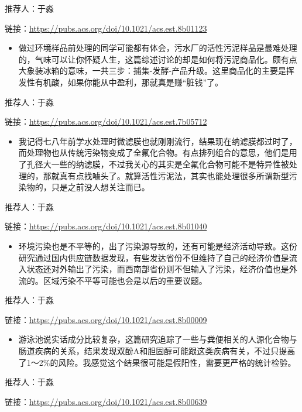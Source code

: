 \documentclass[
]{book}
\providecommand{\tightlist}{%
  \setlength{\itemsep}{0pt}\setlength{\parskip}{0pt}}
\begin{document}
推荐人：于淼

链接：\url{https://pubs.acs.org/doi/10.1021/acs.est.8b01123}

\begin{itemize}
\tightlist
\item
  做过环境样品前处理的同学可能都有体会，污水厂的活性污泥样品是最难处理的，气味可以让你怀疑人生，这篇综述讨论的却是如何将污泥商品化。颇有点大象装冰箱的意味，一共三步：捕集-发酵-产品升级。这里商品化的主要是挥发性有机酸，如果你能从中盈利，那就真是赚``脏钱''了。
\end{itemize}

推荐人：于淼

链接：\url{https://pubs.acs.org/doi/10.1021/acs.est.7b05712}

\begin{itemize}
\tightlist
\item
  我记得七八年前学水处理时微滤膜也就刚刚流行，结果现在纳滤膜都过时了，而处理物也从传统污染物变成了全氟化合物。有点排列组合的意思，他们是用了孔径大一些的纳滤膜，不过我关心的其实是全氟化合物可能不是特异性被处理的，那就真有点找噱头了。就算活性污泥法，其实也能处理很多所谓新型污染物的，只是之前没人想关注而已。
\end{itemize}

推荐人：于淼

链接：\url{https://pubs.acs.org/doi/10.1021/acs.est.8b01040}

\begin{itemize}
\tightlist
\item
  环境污染也是不平等的，出了污染源导致的，还有可能是经济活动导致。这份研究通过国内供应链数据发现，有些发达省份不但维持了自己的经济价值是流入状态还对外输出了污染，而西南部省份则不但输入了污染，经济价值也是外流的。区域污染不平等可能也会是以后的重要议题。
\end{itemize}

推荐人：于淼

链接：\url{https://pubs.acs.org/doi/10.1021/acs.est.8b00009}

\begin{itemize}
\tightlist
\item
  游泳池说实话成分比较复杂，这篇研究追踪了一些与粪便相关的人源化合物与肠道疾病的关系，结果发现双酚A和胆固醇可能跟这类疾病有关，不过只提高了1～2\%的风险。我感觉这个结果很可能是假阳性，需要更严格的统计检验。
\end{itemize}

推荐人：于淼

链接：\url{https://pubs.acs.org/doi/10.1021/acs.est.8b00639}
\end{document}
